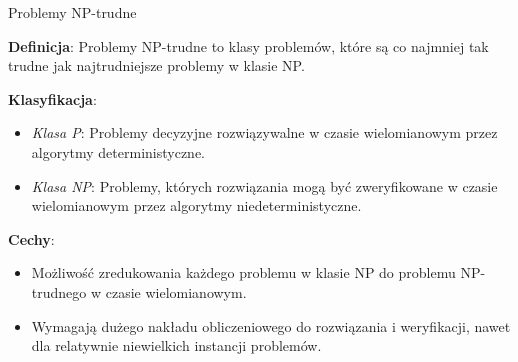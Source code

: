 \begin{frame}{Problemy NP-trudne}

		 \textbf{Definicja}: Problemy NP-trudne to klasy problemów, które są co najmniej tak trudne jak najtrudniejsze problemy w klasie NP.
		\vspace{10pt}
		
		 \textbf{Klasyfikacja}:
		\begin{itemize}
			\item \textit{Klasa P}: Problemy decyzyjne rozwiązywalne w czasie wielomianowym przez algorytmy deterministyczne.
			\item \textit{Klasa NP}: Problemy, których rozwiązania mogą być zweryfikowane w czasie wielomianowym przez algorytmy niedeterministyczne.
		\end{itemize}
		\vspace{10pt}
		 \textbf{Cechy}:
		\begin{itemize}
			\item Możliwość zredukowania każdego problemu w klasie NP do problemu NP-trudnego w czasie wielomianowym.
			\item Wymagają dużego nakładu obliczeniowego do rozwiązania i weryfikacji, nawet dla relatywnie niewielkich instancji problemów.
		\end{itemize}

\end{frame}